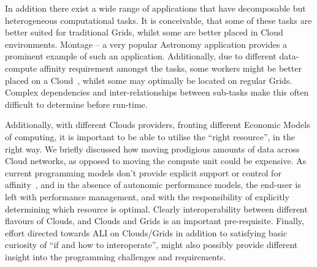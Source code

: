 \documentclass[3p,twocolumn]{elsarticle}
\begin{document}
In addition there exist a wide range of applications that have
decomposable but heterogeneous computational tasks. It is conceivable,
that some of these tasks are better suited for traditional Grids,
whilst some are better placed in Cloud environments. Montage -- a very
popular Astronomy application provides a prominent example of such an
application.  Additionally, due to different data-compute affinity
requirement amongst the tasks, some workers might be better placed on
a Cloud~\cite{jha_ccpe09}, whilst some may optimally be located on
regular Grids.  Complex dependencies and inter-relationships between
sub-tasks make this often difficult to determine before run-time.

Additionally, with different Clouds providers, fronting different
Economic Models of computing, it is important to be able to utilise
the ``right resource'', in the right way. We briefly discussed how
moving prodigious amounts of data across Cloud networks, as opposed to
moving the compute unit could be expensive.  As current programming
models don't provide explicit support or control for
affinity~\cite{jha_ccpe09}, and in the absence of autonomic
performance models, the end-user is left with performance management,
and with the responsibility of explicitly determining which resource
is optimal. Clearly interoperability between different flavours of
Clouds, and Clouds and Grids is an important pre-requisite.  Finally,
effort directed towards ALI on Clouds/Grids in addition to satisfying
basic curiosity of ``if and how to interoperate'', might also possibly
provide different insight into the programming challenges and
requirements.




\end{document}
